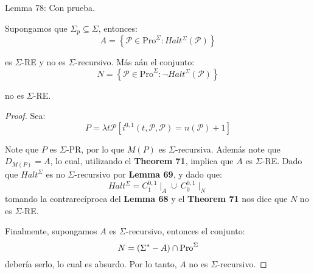   Lemma 78: Con prueba.
  \begin{lemma}
    \PN Supongamos que $\Sigma_{p} \subseteq \Sigma$, entonces:
    \[
      A = \left\{\mathcal{P} \in \mathrm{Pro}^{\Sigma}: Halt^{\Sigma}(\mathcal{P})\right\}
    \]

    \PN es $\Sigma$-RE y no es $\Sigma$-recursivo. Más aán el conjunto:
    \[
      N = \left\{\mathcal{P} \in \mathrm{Pro}^{\Sigma}: \lnot Halt^{\Sigma}(\mathcal{P})\right\}
    \]

    \PN no es $\Sigma$-RE.
  \end{lemma}
  \begin{proof}
    \PN Sea:
    \[
      P = \lambda t\mathcal{P}\left[i^{0,1}(t,\mathcal{P},\mathcal{P}) = n(\mathcal{P}) + 1\right]
    \]

    \PN Note que $P$ es $\Sigma$-PR, por lo que $M(P)$ es $\Sigma$-recursiva. Además note que $D_{M(P)}=A$, lo cual,
    utilizando el \textbf{Theorem 71}, implica que $A$ es $\Sigma$-RE. Dado que $Halt^{\Sigma}$ es no $\Sigma$-recursivo
    por \textbf{Lemma 69}, y dado que:
    \[
      Halt^{\Sigma} = C_{1}^{0,1}\mid_{A} \cup \ C_{0}^{0,1}\mid_{N}
    \]
    \PN tomando la contrarecíproca del \textbf{Lemma 68} y el \textbf{Theorem 71} nos dice que $N$ no es $\Sigma$-RE.

    \PN Finalmente, supongamos $A$ es $\Sigma$-recursivo, entonces el conjunto:
    \[
      N = \left(\Sigma^{\ast}-A\right) \cap \mathrm{Pro}^{\Sigma}
    \]
    \PN debería serlo, lo cual es absurdo. Por lo tanto, $A$ no es $\Sigma$-recursivo.
  \end{proof}
